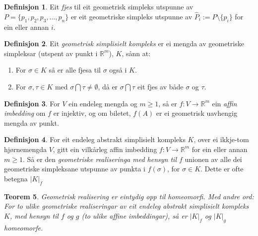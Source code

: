 \documentclass[a4paper, titlepage, 12pt, norsk]{article}
\theoremstyle{plain}
\newtheorem{theorem}{Teorem}[section]
\theoremstyle{definition}
\newtheorem{definition}[theorem]{Definisjon}
\newcommand{\Rb}{\mathbb{R}}
\begin{document}
\begin{definition}
	Eit \emph{fjes} til eit geometrisk simpleks utspunne av $P=\{p_1, p_2, p_3, \dots, p_n\}$ er eit geometriske simpleks utspunne av $\hat{P}_i := P\setminus \{p_i\}$ for ein eller annan $i$.
\end{definition}
\begin{definition} %
	Eit \emph{geometrisk simplisielt kompleks} er ei mengda av geometriske simpleksar (utspent av punkt i $\Rb^m$), $K$, sånn at:
	\begin{enumerate}
		\item{For $\sigma \in K$ så er alle fjesa til $\sigma$ også i $K$.}
		\item{For $\sigma, \tau \in K$ med $\sigma \bigcap \tau \neq \emptyset$, då er $\sigma \bigcap \tau$ eit fjes av både $\sigma$ og $\tau$.}
	\end{enumerate}
\end{definition}
\begin{definition}
	For $V$ ein endeleg mengda og $m\geq1$, så er $f:V\rightarrow \Rb^m$ ein \emph{affin imbedding} om $f$ er injektiv, og om biletet, $f(A)$ er ei geometrisk uavhengig mengda av punkt.
\end{definition}
\begin{definition}
	For eit endeleg abstrakt simplisielt kompleks $K$, over ei ikkje-tom hjørnemengda $V$, gitt ein vilkårleg affin imbedding $f:V\to\Rb^m$ for ein eller annan $m\geq1$. Så er den \emph{geometriske realiseringa med hensyn til $f$} unionen av alle dei geometriske simpleksane utspunne av punkta i $f(\sigma)$, for $\sigma\in K$. Dette er ofte betegna $|K|_f$
\end{definition}
\begin{theorem}
	Geometrisk realisering er eintydig opp til homeomorfi. Med andre ord: For to ulike geometriske realiseringar av eit endeleg abstrakt simplisielt kompleks $K$, med hensyn til $f$ og $g$ (to ulike affine imbeddingar), så er $|K|_f$ og $|K|_g$ homeomorfe.
\end{theorem}
\end{document}
